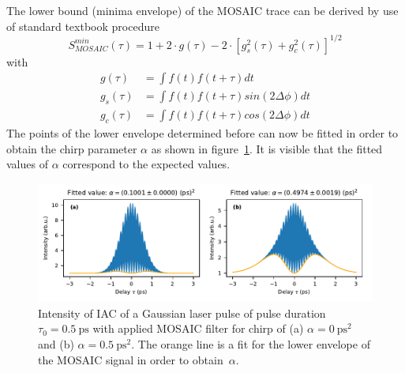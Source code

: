The lower bound (minima envelope) of the MOSAIC trace can be derived by use of standard textbook procedure~\cite{klein_optics_1986}
\begin{equation}
S^{min}_{MOSAIC}(\tau)= 1 + 2 \cdot g(\tau) - 2 \cdot [g_s^2(\tau)+g_c^2(\tau)]^{1/2}
\end{equation}
with
\begin{align}
g(\tau)&=\int f(t)f(t+\tau)dt\\
g_s(\tau)&=\int f(t)f(t+\tau)sin(2\Delta\phi)dt\\
g_c(\tau)&=\int f(t)f(t+\tau)cos(2\Delta\phi)dt
\end{align}
The points of the lower envelope determined before can now be fitted in order to obtain the chirp parameter $\alpha$ as shown in figure~\ref{fig:mosaicchirpedlaserpulsefitenvelope}.
It is visible that the fitted values of $\alpha$ correspond to the expected values.
\begin{figure}[H]
	\centering
	\includegraphics[width=\linewidth]{figures/chirp/plots/mosaic_chirped_laser_pulse_fit_envelope}
	\caption[Intensity of IAC of a Gaussian laser pulse of pulse duration $\tau_0=\SI{0.5}{\pico \second}$ with applied MOSAIC filter and fitted $\alpha$-values.]{Intensity of IAC of a Gaussian laser pulse of pulse duration $\tau_0=\SI{0.5}{\pico \second}$ with applied MOSAIC filter for chirp of (a) $\alpha = \SI{0}{\pico \second \squared}$ and (b) $\alpha = \SI{0.5}{\pico \second \squared}$.
		The orange line is a fit for the lower envelope of the MOSAIC signal in order to obtain~$\alpha$.}
	\label{fig:mosaicchirpedlaserpulsefitenvelope}
\end{figure}

